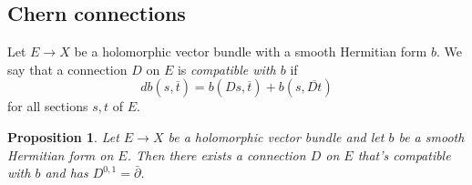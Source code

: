 \documentclass[10pt,a4paper]{article}
\newtheorem{prop}[theo]{Proposition}
\def\ov#1{\overline{#1}}
\begin{document}
\subsection{Chern connections}



Let $E \to X$ be a holomorphic vector bundle with a smooth Hermitian form $b$. We say that a connection $D$ on $E$ is \emph{compatible with $b$} if
\[
d b(s, \ov t) = b(Ds, \ov t) + b(s, \ov{Dt})
\]
for all sections $s, t$ of $E$.


\begin{prop}
Let $E \to X$ be a holomorphic vector bundle and let $b$ be a smooth Hermitian form on $E$. Then there exists a connection $D$ on $E$ that's compatible with $b$ and has $D^{0,1} = \bar\partial$.
\end{prop}
\end{document}

